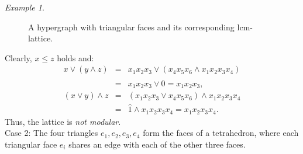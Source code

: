 \documentclass[11pt]{amsart}
\newcommand{\lcm}{\mathrm{lcm}}
\theoremstyle{plain}
\numberwithin{lemma}{\DefaultNumberTheoremWithin}
\numberwithin{claim}{\DefaultNumberTheoremWithin}
\numberwithin{theorem}{\DefaultNumberTheoremWithin}
\numberwithin{corollary}{\DefaultNumberTheoremWithin}
\numberwithin{proposition}{\DefaultNumberTheoremWithin}
\numberwithin{conjecture}{\DefaultNumberTheoremWithin}
\theoremstyle{definition}
\numberwithin{definition}{\DefaultNumberTheoremWithin}
\theoremstyle{definition}
\numberwithin{question}{\DefaultNumberTheoremWithin}
\theoremstyle{definition}
\numberwithin{problem}{\DefaultNumberTheoremWithin}
\theoremstyle{remark}
\numberwithin{remark}
     {\DefaultNumberTheoremWithin}
\theoremstyle{remark}
\newtheorem{example}{Example}
\numberwithin{example}{\DefaultNumberTheoremWithin}
\begin{document}
\begin{example}
\begin{figure}[h]
\begin{minipage}{0.55\textwidth}
  \end{minipage}
\caption{A hypergraph with triangular faces and its corresponding $\lcm$-lattice.}\label{F3}
\end{figure}
    Clearly, $x \leq z$ holds and:
    \begin{eqnarray}
    \nonumber x \vee (y \wedge z) &=& x_1x_2x_3 \vee(x_4x_5x_6\wedge x_1x_2x_3x_4)\\ 
    \nonumber   &=& x_1x_2x_3\vee \hat{0} =x_1x_2x_3,\\
    \nonumber (x \vee y) \wedge z &=& (x_1x_2x_3 \vee x_4x_5x_6)\wedge x_1x_2x_3x_4\\ 
   \nonumber  &=&  \hat{1}\wedge x_1x_2x_3x_4=x_1x_2x_3x_4.
\end{eqnarray}
   Thus, the lattice is \emph{not modular}.\\
    Case 2:
    The four triangles $e_1,e_2,e_3,e_4$ form the faces of a tetrahedron, where each triangular face $e_i$ shares an edge with each of the other three faces.  


\end{example}
\end{document}
